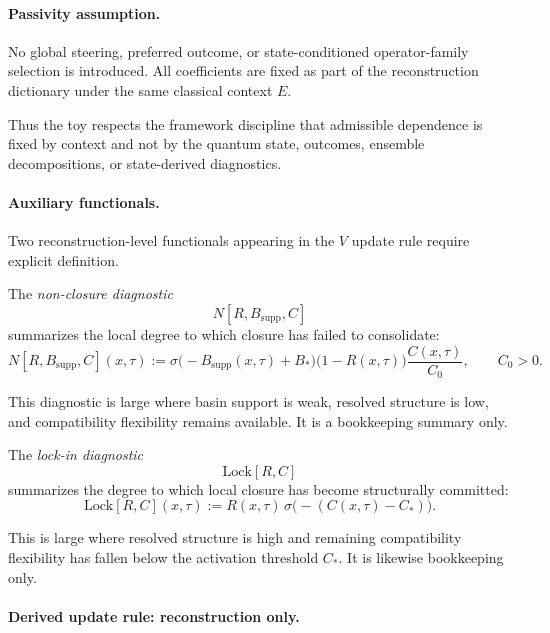\documentclass[aps,prx,onecolumn,11pt]{revtex4-2}
\theoremstyle{plain}
\theoremstyle{definition}
\theoremstyle{remark}
\begin{document}
\paragraph{Passivity assumption.}

No global steering, preferred outcome, or state-conditioned
operator-family selection is introduced. All coefficients are fixed as
part of the reconstruction dictionary under the same classical context
\(E\).

Thus the toy respects the framework discipline that admissible
dependence is fixed by context and not by the quantum state, outcomes,
ensemble decompositions, or state-derived diagnostics.

\paragraph{Auxiliary functionals.}

Two reconstruction-level functionals appearing in the \(V\) update rule
require explicit definition.

The \emph{non-closure diagnostic}
\[
N[R,B_{\mathrm{supp}},C]
\]
summarizes the local degree to which closure has failed to consolidate:
\begin{equation}
N[R,B_{\mathrm{supp}},C](x,\tau)
:=
\sigma\!\bigl(
-B_{\mathrm{supp}}(x,\tau)+B_\ast
\bigr)
\bigl(1-R(x,\tau)\bigr)
\frac{C(x,\tau)}{C_0},
\qquad
C_0>0.
\label{eq:toy_sep_nonclosure_diag}
\end{equation}

This diagnostic is large where basin support is weak, resolved
structure is low, and compatibility flexibility remains available. It
is a bookkeeping summary only.

The \emph{lock-in diagnostic}
\[
\mathrm{Lock}[R,C]
\]
summarizes the degree to which local closure has become structurally
committed:
\begin{equation}
\mathrm{Lock}[R,C](x,\tau)
:=
R(x,\tau)\,
\sigma\!\bigl(
-(C(x,\tau)-C_\ast)
\bigr).
\label{eq:toy_sep_lock_diag}
\end{equation}

This is large where resolved structure is high and remaining
compatibility flexibility has fallen below the activation threshold
\(C_\ast\). It is likewise bookkeeping only.

\paragraph{Derived update rule: reconstruction only.}
\end{document}

